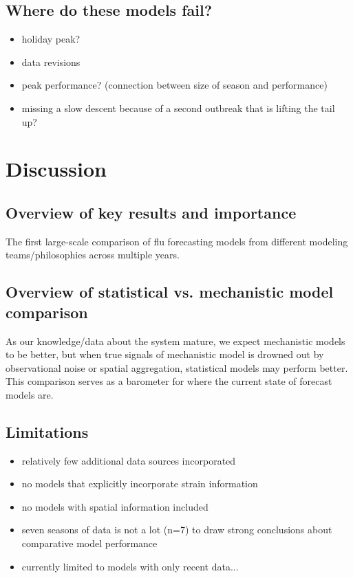 \documentclass{article}
\begin{document}
\subsection{Where do these models fail?}

\begin{itemize}
    \item holiday peak?
    \item data revisions
    \item peak performance? (connection between size of season and performance)
    \item missing a slow descent because of a second outbreak that is lifting the tail up?
\end{itemize}


\section{Discussion}

\subsection{Overview of key results and importance}
The first large-scale comparison of flu forecasting models from different modeling teams/philosophies across multiple years.

\subsection{Overview of statistical vs. mechanistic model comparison}
As our knowledge/data about the system mature, we expect mechanistic models to be better, but when true signals of mechanistic model is drowned out by observational noise or spatial aggregation, statistical models may perform better. This comparison serves as a barometer for where the current state of forecast models are.

\subsection{Limitations}

\begin{itemize}
    \item relatively few additional data sources incorporated
    \item no models that explicitly incorporate strain information
    \item no models with spatial information included
    \item seven seasons of data is not a lot (n=7) to draw strong conclusions about comparative model performance
    \item currently limited to models with only recent data...
\end{itemize}



\end{document}
